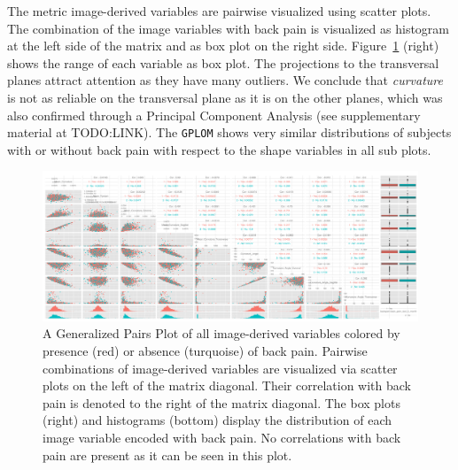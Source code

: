 \documentclass[a4paper,twoside]{style/article}
\begin{document}
The metric image-derived variables are pairwise visualized using scatter plots.
The combination of the image variables with back pain is visualized as histogram at the left side of the matrix and as box plot on the right side.
Figure~\ref{fig:image-parameter-range} (right) shows the range of each variable as box plot.
The projections to the transversal planes attract attention as they have many outliers.
We conclude that \emph{curvature} is not as reliable on the transversal plane as it is on the other planes, which was also confirmed through a Principal Component Analysis (see supplementary material at TODO:LINK).
The \texttt{GPLOM} shows very similar distributions of subjects with or without back pain with respect to the shape variables in all sub plots.
\begin{figure}[htb]
  \centering
  \includegraphics[width=1.0\textwidth]{figures/image-parameter-range}
  \caption{
A Generalized Pairs Plot of all image-derived variables colored by presence (red) or absence (turquoise) of back pain.
Pairwise combinations of image-derived variables are visualized via scatter plots on the left of the matrix diagonal.
Their correlation with back pain is denoted to the right of the matrix diagonal.
The box plots (right) and histograms (bottom) display the distribution of each image variable encoded with back pain.
No correlations with back pain are present as it can be seen in this plot.
}
  \label{fig:image-parameter-range}
\end{figure}
\end{document}

